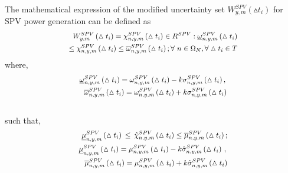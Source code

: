 \documentclass[journal]{IEEEtran}
\begin{document}
\par The mathematical expression of the modified uncertainty set  $W_{y,m}^{SPV}(\vartriangle{{t}_{i}})$ for SPV power generation can be defined as
\begin{equation}
\scalebox{0.89}[0.89]{$
\begin{split}
 W_{y,m}^{SPV}\left(\vartriangle{{t}_{i}} \right)= \chi _{n,y,m}^{SPV}\left( \vartriangle {{t}_{i}} \right)\in {{R}^{SPV}}:\underline{\omega }_{n,y,m}^{SPV}\left( \vartriangle {{t}_{i}} \right) \\\le \chi _{n,y,m}^{SPV}\left(\vartriangle {{t}_{i}} \right)\le \overline{\omega }_{n,y,m}^{SPV}\left( \vartriangle {{t}_{i}} \right); 
 \forall \ n\in {{\Omega }_{N}},\forall \vartriangle {{t}_{i}}\in T
\end{split}
$}
\label{eqn5a}
\end{equation}
where,
\begin{equation}
\scalebox{0.9}[0.9]{$
	\begin{split}
\underline{\omega }_{n,y,m}^{SPV}\left( \vartriangle {{t}_{i}} \right)=\omega _{n,y,m}^{SPV}\left( \vartriangle {{t}_{i}} \right)-k\sigma _{n,y,m}^{SPV}\left( \vartriangle {{t}_{i}} \right),\,\\ \overline{\omega }_{n,y,m}^{SPV}\left( \vartriangle {{t}_{i}} \right)=\omega _{n,y,m}^{SPV}\left( \vartriangle {{t}_{i}} \right)+k\sigma _{n,y,m}^{SPV}\left( \vartriangle {{t}_{i}} \right) \\ 
\, \\ 	
\end{split}
$}
\label{eqn6a}
\end{equation}
such that,
\begin{equation}
\scalebox{0.9}[0.9]{$
	\begin{split}
\text{ }\underline{\mu }_{n,y,m}^{SPV}\left( \vartriangle {{t}_{i}} \right)\,\le \,\hat{\chi }_{n,y,m}^{SPV}\left( \vartriangle {{t}_{i}} \right)\le \overline{\mu }_{n,y,m}^{SPV}\left( \vartriangle {{t}_{i}} \right); \\ \underline{\mu }_{n,y,m}^{SPV}\left( \vartriangle {{t}_{i}} \right)=\mu _{n,y,m}^{SPV}\left( \vartriangle {{t}_{i}} \right)-k\hat{\sigma }_{n,y,m}^{SPV}\left( \vartriangle {{t}_{i}} \right)\,,\,\\ \overline{\mu }_{n,y,m}^{SPV}\left( \vartriangle {{t}_{i}} \right)=\mu _{n,y,m}^{SPV}\left( \vartriangle {{t}_{i}} \right)+k\hat{\sigma }_{n,y,m}^{SPV}\left( \vartriangle {{t}_{i}} \right) \\
\end{split}
$}
\label{eqn7a} 
\end{equation}
\end{document}
